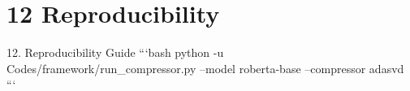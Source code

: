 \section{12 Reproducibility}

 12. Reproducibility Guide
```bash
python -u Codes/framework/run\_compressor.py --model roberta-base --compressor adasvd
```
